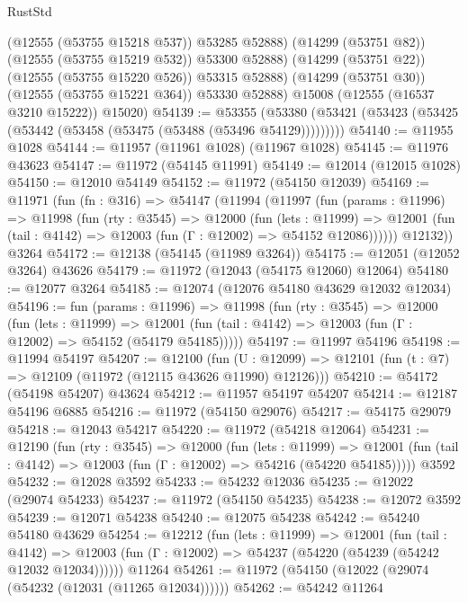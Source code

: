 \begin{lexlean}{RustStd}
\begin{coremodule}
              (@12555 (@53755 @15218 @537))
              @53285
              @52888)
            (@14299 (@53751 @82))
            (@12555 (@53755 @15219 @532))
            @53300
            @52888)
          (@14299 (@53751 @22))
          (@12555 (@53755 @15220 @526))
          @53315
          @52888)
        (@14299 (@53751 @30))
        (@12555 (@53755 @15221 @364))
        @53330
        @52888)
      @15008
      (@12555 (@16537 @3210 @15222))
      @15020)
@54139 := @53355
    (@53380 (@53421 (@53423 (@53425 (@53442 (@53458 (@53475 (@53488 (@53496 @54129)))))))))
@54140 := @11955 @1028
@54144 := @11957 (@11961 @1028) (@11967 @1028)
@54145 := @11976 @43623
@54147 := @11972 (@54145 @11991)
@54149 := @12014 (@12015 @1028)
@54150 := @12010 @54149
@54152 := @11972 (@54150 @12039)
@54169 := @11971
    (fun (fn : @316) =>
    @54147
      (@11994
        (@11997
          (fun (params : @11996) =>
          @11998
            (fun (rty : @3545) =>
            @12000
              (fun (lets : @11999) =>
              @12001 (fun (tail : @4142) => @12003 (fun (Γ : @12002) => @54152 @12086))))))
        @12132))
    @3264
@54172 := @12138 (@54145 (@11989 @3264))
@54175 := @12051 (@12052 @3264) @43626
@54179 := @11972 (@12043 (@54175 @12060) @12064)
@54180 := @12077 @3264
@54185 := @12074 (@12076 @54180 @43629 @12032 @12034)
@54196 := fun (params : @11996) =>
  @11998
    (fun (rty : @3545) =>
    @12000
      (fun (lets : @11999) =>
      @12001 (fun (tail : @4142) => @12003 (fun (Γ : @12002) => @54152 (@54179 @54185)))))
@54197 := @11997 @54196
@54198 := @11994 @54197
@54207 := @12100
    (fun (U : @12099) => @12101 (fun (t : @7) => @12109 (@11972 (@12115 @43626 @11990) @12126)))
@54210 := @54172 (@54198 @54207) @43624
@54212 := @11957 @54197 @54207
@54214 := @12187 @54196 @6885
@54216 := @11972 (@54150 @29076)
@54217 := @54175 @29079
@54218 := @12043 @54217
@54220 := @11972 (@54218 @12064)
@54231 := @12190
    (fun (rty : @3545) =>
    @12000
      (fun (lets : @11999) =>
      @12001 (fun (tail : @4142) => @12003 (fun (Γ : @12002) => @54216 (@54220 @54185)))))
    @3592
@54232 := @12028 @3592
@54233 := @54232 @12036
@54235 := @12022 (@29074 @54233)
@54237 := @11972 (@54150 @54235)
@54238 := @12072 @3592
@54239 := @12071 @54238
@54240 := @12075 @54238
@54242 := @54240 @54180 @43629
@54254 := @12212
    (fun (lets : @11999) =>
    @12001
      (fun (tail : @4142) =>
      @12003 (fun (Γ : @12002) => @54237 (@54220 (@54239 (@54242 @12032 @12034))))))
    @11264
@54261 := @11972 (@54150 (@12022 (@29074 (@54232 (@12031 (@11265 @12034))))))
@54262 := @54242 @11264

\end{coremodule}
\end{lexlean}
